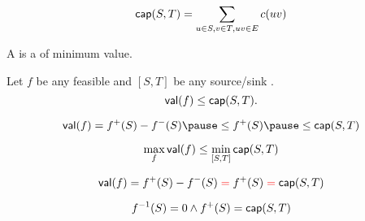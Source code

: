 \begin{frame}{}

  \begin{definition}
    \[
      \textsf{cap}(S, T) = \sum_{u \in S, v \in T, uv \in E} c(uv)
    \]
  \end{definition}
\end{frame}

\begin{frame}{}

  \vspace{0.50cm}
  \begin{definition}
    A  is a  of minimum value.
  \end{definition}
\end{frame}

\begin{frame}{}
  \begin{theorem}
    Let $f$ be any feasible  and $[S, T]$ be any source/sink .
    \[
      \textsf{val}(f) \le \textsf{cap}(S, T).
    \]
  \end{theorem}


  \pause
  \[
    \val(f) = f^{+}(S) - f^{-}(S) \pause \le f^{+}(S) \pause \le \capacity(S, T)
  \]
\end{frame}

\begin{frame}{}
  \begin{lemma}
    \[
      \max_{f} \textsf{val}(f) \le \min_{[S, T]} \textsf{cap}(S, T)
    \]
  \end{lemma}

\end{frame}

\begin{frame}{}
  \begin{center}
  \end{center}

  \pause
  \[
    \textsf{val}(f) = f^{+}(S) - f^{-}(S) \;\textcolor{red}{=}\; f^{+}(S) \;\textcolor{red}{=}\; \textsf{cap}(S, T)
  \]

  \pause
  \[
    f^{-1}(S) = 0 \land f^{+}(S) = \textsf{cap}(S, T)
  \]

  \pause
\end{frame}

